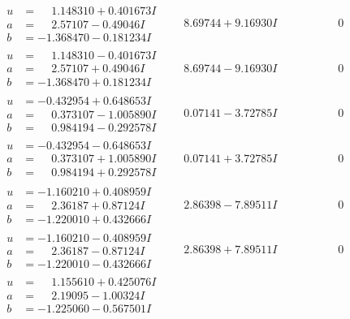 \documentclass[1p]{elsarticle_modified}
\theoremstyle{definition}
\begin{document}
$$\begin{array}{c|c|c}
\begin{aligned}
u &= \phantom{-}1.148310 + 0.401673 I \\
a &= \phantom{-}2.57107 - 0.49046 I \\
b &= -1.368470 - 0.181234 I\end{aligned}
 & \phantom{-}8.69744 + 9.16930 I & \phantom{-0.000000 } 0 \\ \hline\begin{aligned}
u &= \phantom{-}1.148310 - 0.401673 I \\
a &= \phantom{-}2.57107 + 0.49046 I \\
b &= -1.368470 + 0.181234 I\end{aligned}
 & \phantom{-}8.69744 - 9.16930 I & \phantom{-0.000000 } 0 \\ \hline\begin{aligned}
u &= -0.432954 + 0.648653 I \\
a &= \phantom{-}0.373107 - 1.005890 I \\
b &= \phantom{-}0.984194 - 0.292578 I\end{aligned}
 & \phantom{-}0.07141 - 3.72785 I & \phantom{-0.000000 } 0 \\ \hline\begin{aligned}
u &= -0.432954 - 0.648653 I \\
a &= \phantom{-}0.373107 + 1.005890 I \\
b &= \phantom{-}0.984194 + 0.292578 I\end{aligned}
 & \phantom{-}0.07141 + 3.72785 I & \phantom{-0.000000 } 0 \\ \hline\begin{aligned}
u &= -1.160210 + 0.408959 I \\
a &= \phantom{-}2.36187 + 0.87124 I \\
b &= -1.220010 + 0.432666 I\end{aligned}
 & \phantom{-}2.86398 - 7.89511 I & \phantom{-0.000000 } 0 \\ \hline\begin{aligned}
u &= -1.160210 - 0.408959 I \\
a &= \phantom{-}2.36187 - 0.87124 I \\
b &= -1.220010 - 0.432666 I\end{aligned}
 & \phantom{-}2.86398 + 7.89511 I & \phantom{-0.000000 } 0 \\ \hline\begin{aligned}
u &= \phantom{-}1.155610 + 0.425076 I \\
a &= \phantom{-}2.19095 - 1.00324 I \\
b &= -1.225060 - 0.567501 I\end{aligned}

\end{array}$$
\end{document}
